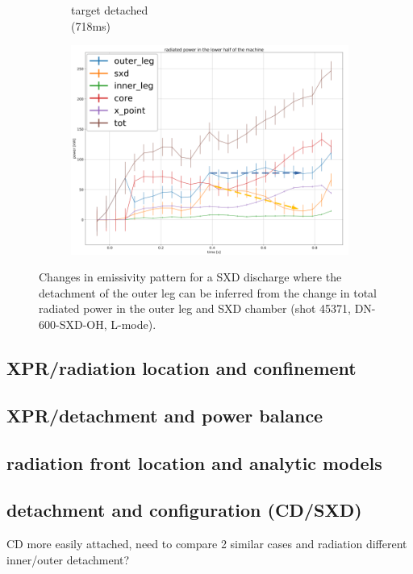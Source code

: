 \begin{figure}
\begin{subfigure}{0.21\textwidth}
         \caption{target detached\\(718ms)}
         \label{fig:45371_2}
     \end{subfigure}
     \hfill
     \begin{subfigure}{0.5\textwidth}
         \centering
         \includegraphics[trim={0 0 0 0},clip,width=\textwidth]{Chapters/chapter2/figs/45371_3.png}
         \label{fig:45371_3}
     \end{subfigure}
    \caption{Changes in emissivity pattern for a SXD discharge where the detachment of the outer leg can be inferred from the change in total radiated power in the outer leg and SXD chamber (shot 45371, DN-600-SXD-OH, L-mode).}
    \label{fig:45371}
\end{figure}

\subsection{XPR/radiation location and confinement}
\subsection{XPR/detachment and power balance}
\subsection{radiation front location and analytic models}
\subsection{detachment and configuration (CD/SXD)}
CD more easily attached, need to compare 2 similar cases and radiation
different inner/outer detachment?
